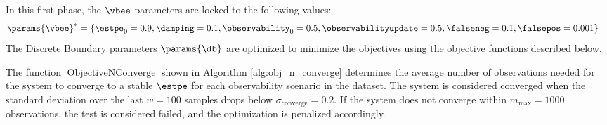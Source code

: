 In this first phase, the $\vbee$ parameters are locked to the following values:
\begin{align*}
    \params{\vbee}^* &= \{\estpe_0 = 0.9, \damping = 0.1, \observability_0 = 0.5, \observabilityupdate = 0.5, \falseneg = 0.1, \falsepos = 0.001\}
\end{align*}
The Discrete Boundary parameters $\params{\db}$ are optimized to minimize the objectives using the objective functions described below. 

The function $\operatorname{ObjectiveNConverge}$ shown in Algorithm \ref{alg:obj_n_converge} determines the average number of observations needed for the system to converge to a stable $\estpe$ for each observability scenario in the dataset. The system is considered converged when the standard deviation over the last $w = 100$ samples drops below $\sigma_{\text{converge}} = 0.2$. If the system does not converge within $m_{\text{max}} = 1000$ observations, the test is considered failed, and the optimization is penalized accordingly.

\begin{singlespace}
    \begin{algorithm}[H]
        \caption[Objective Function: $n_{converge}$]{ObjectiveNConverge}
        \label{alg:obj_n_converge}
        \begin{algorithmic}[1]
                        \EndIf
                    \EndIf
                \EndFor
                \Else
                \EndIf
            \EndFor
            \EndFunction
        \end{algorithmic}
    \end{algorithm}
\end{singlespace}


